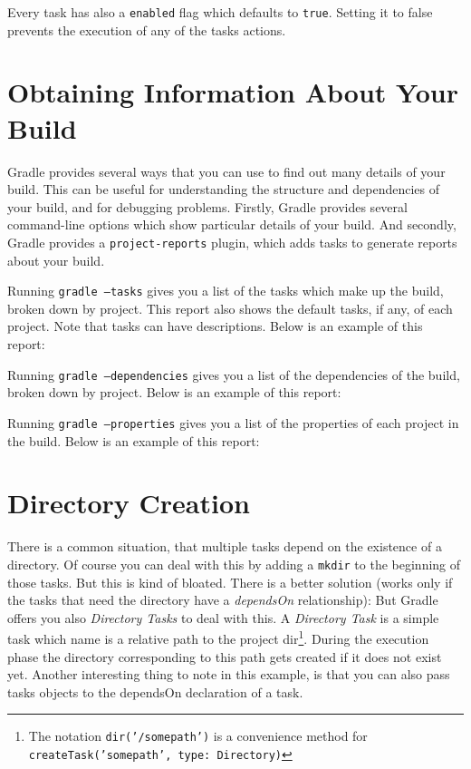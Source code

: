 Every task has also a \texttt{enabled} flag which defaults to \texttt{true}. Setting it to false prevents the execution of any of the tasks actions.

\section{Obtaining Information About Your Build}
Gradle provides several ways that you can use to find out many details of your build. This can be useful for
understanding the structure and dependencies of your build, and for debugging problems. Firstly, Gradle provides several
command-line options which show particular details of your build. And secondly, Gradle provides a \texttt{project-reports}
plugin, which adds tasks to generate reports about your build.

Running \texttt{gradle --tasks} gives you a list of the tasks which make up the build, broken down by project. This
report also shows the default tasks, if any, of each project. Note that tasks can have descriptions. Below is an example
of this report:

Running \texttt{gradle --dependencies} gives you a list of the dependencies of the build, broken down by project. Below
is an example of this report:

Running \texttt{gradle --properties} gives you a list of the properties of each project in the build. Below is an
example of this report:

\section{Directory Creation} %
\label{sec:directory_creation}
There is a common situation, that multiple tasks depend on the existence of a directory. Of course you can deal with this by adding a \texttt{mkdir} to the beginning of those tasks. But this is kind of bloated. 
There is a better solution (works only if the tasks that need the directory have a \emph{dependsOn} relationship):
But Gradle offers you also \emph{Directory Tasks} to deal with this.
A \emph{Directory Task} is a simple task which name is a relative path to the project dir\footnote{The notation \texttt{dir('/somepath')} is a convenience method for \texttt{createTask('somepath', type: Directory)}}. During the execution phase the directory corresponding to this path gets created if it does not exist yet. Another interesting thing to note in this example, is that you can also pass tasks objects to the dependsOn declaration of a task.

